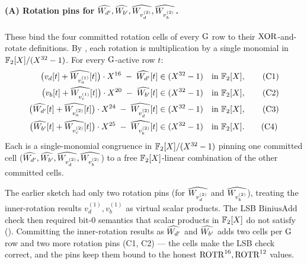
\paragraph{(A) Rotation pins for $\widehat{W_{d'}}, \widehat{W_{b'}}, \widehat{W_{v_d^{(2)}}}, \widehat{W_{v_b^{(2)}}}$.}

These bind the four committed rotation cells of every $\operatorname{G}$ row to
their $\operatorname{XOR}$-and-rotate definitions. By , each
rotation is multiplication by a single monomial in $\mathbb{F}_2[X]/(X^{32}-1)$. For every
$\operatorname{G}$-active row $t$:
\begin{align}
\bigl(v_d[t] + \widehat{W_{v_a^{(1)}}}[t]\bigr) \cdot X^{16}
   \;-\; \widehat{W_{d'}}[t]
   &\in (X^{32}-1) \quad \text{in } \mathbb{F}_2[X], \tag{C1}\label{con:b3-rot-dprime}\\
\bigl(v_b[t] + \widehat{W_{v_c^{(1)}}}[t]\bigr) \cdot X^{20}
   \;-\; \widehat{W_{b'}}[t]
   &\in (X^{32}-1) \quad \text{in } \mathbb{F}_2[X], \tag{C2}\label{con:b3-rot-bprime}\\
\bigl(\widehat{W_{d'}}[t] + \widehat{W_{v_a^{(2)}}}[t]\bigr) \cdot X^{24}
   \;-\; \widehat{W_{v_d^{(2)}}}[t]
   &\in (X^{32}-1) \quad \text{in } \mathbb{F}_2[X], \tag{C3}\label{con:b3-rot-vd}\\
\bigl(\widehat{W_{b'}}[t] + \widehat{W_{v_c^{(2)}}}[t]\bigr) \cdot X^{25}
   \;-\; \widehat{W_{v_b^{(2)}}}[t]
   &\in (X^{32}-1) \quad \text{in } \mathbb{F}_2[X]. \tag{C4}\label{con:b3-rot-vb}
\end{align}
Each is a single-monomial congruence in $\mathbb{F}_2[X]/(X^{32}-1)$ pinning one committed
cell ($\widehat{W_{d'}}, \widehat{W_{b'}}, \widehat{W_{v_d^{(2)}}}, \widehat{W_{v_b^{(2)}}}$)
to a free $\mathbb{F}_2[X]$-linear combination of the other committed cells.

\begin{remark}
\label{rem:b3-four-rotation-pins}
The earlier sketch had only two rotation pins (for $\widehat{W_{v_d^{(2)}}}$
and $\widehat{W_{v_b^{(2)}}}$), treating the inner-rotation results
$v_d^{(1)}, v_b^{(1)}$ as virtual scalar products. The LSB
$\mathrm{BiniusAdd}$ check then required bit-$0$ semantics that
scalar products in $\mathbb{F}_2[X]$ do not satisfy
(). Committing the inner-rotation
results as $\widehat{W_{d'}}$ and $\widehat{W_{b'}}$ adds two cells per
$\operatorname{G}$ row and two more rotation pins (C1, C2) — the cells make the
LSB check correct, and the pins keep them bound to the honest
$\operatorname{ROTR}^{16}, \operatorname{ROTR}^{12}$ values.
\end{remark}

